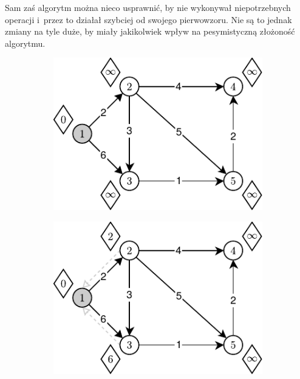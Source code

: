 Sam zaś algorytm można nieco usprawnić, by nie wykonywał niepotrzebnych operacji i~przez to działał szybciej od swojego pierwowzoru.
Nie są to jednak zmiany na tyle duże, by miały jakikolwiek wpływ na pesymistyczną złożoność algorytmu.

\begin{figure}[!htbp]
	\centering
	\null\hfill
	\begin{subfigure}[b]{0.24\textwidth}
		\includegraphics[width=\textwidth]{Chapter_I/BELLMAN-FORD-Example/a.pdf}
		\caption{}
		\label{fig:exampleBellmanFord:a}
	\end{subfigure}
	\hfill
	\begin{subfigure}[b]{0.24\textwidth}
		\includegraphics[width=\textwidth]{Chapter_I/BELLMAN-FORD-Example/b.pdf}
		\caption{}

\end{subfigure}
\end{figure}
